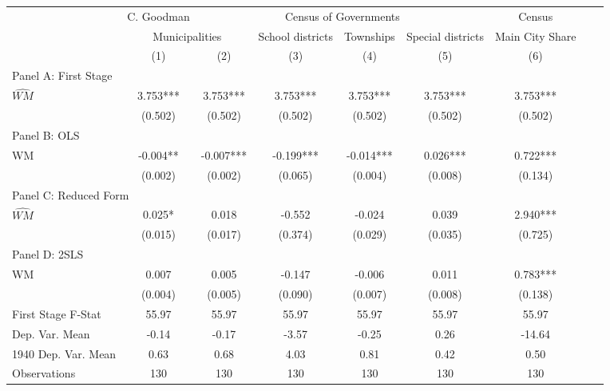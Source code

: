  \begin{tabular}{l*{8}{c}} \toprule
&\multicolumn{1}{c}{C. Goodman}&\multicolumn{4}{c}{Census of Governments}&\multicolumn{1}{c}{Census}\\\cmidrule(lr){2-2}\cmidrule(lr){3-6}\cmidrule(lr){7-7}
&\multicolumn{2}{c}{Municipalities}&\multicolumn{1}{c}{School districts}&\multicolumn{1}{c}{Townships}&\multicolumn{1}{c}{Special districts}&\multicolumn{1}{c}{Main City Share}\\\cmidrule(lr){2-3}\cmidrule(lr){4-6}\cmidrule(lr){7-7}
&\multicolumn{1}{c}{(1)}&\multicolumn{1}{c}{(2)}&\multicolumn{1}{c}{(3)}&\multicolumn{1}{c}{(4)}&\multicolumn{1}{c}{(5)}&\multicolumn{1}{c}{(6)}\\
\cmidrule(lr){1-7}
\multicolumn{6}{l}{Panel A: First Stage}\\
\cmidrule(lr){1-7}
$\widehat{WM}$  &    3.753***&    3.753***&    3.753***&    3.753***&    3.753***&    3.753***\\
                &  (0.502)   &  (0.502)   &  (0.502)   &  (0.502)   &  (0.502)   &  (0.502)   \\
\cmidrule(lr){1-7}
\multicolumn{6}{l}{Panel B: OLS}\\
\cmidrule(lr){1-7}
WM              &   -0.004** &   -0.007***&   -0.199***&   -0.014***&    0.026***&    0.722***\\
                &  (0.002)   &  (0.002)   &  (0.065)   &  (0.004)   &  (0.008)   &  (0.134)   \\
\cmidrule(lr){1-7}
\multicolumn{6}{l}{Panel C: Reduced Form}\\
\cmidrule(lr){1-7}
$\widehat{WM}$  &    0.025*  &    0.018   &   -0.552   &   -0.024   &    0.039   &    2.940***\\
                &  (0.015)   &  (0.017)   &  (0.374)   &  (0.029)   &  (0.035)   &  (0.725)   \\
\cmidrule(lr){1-7}
\multicolumn{6}{l}{Panel D: 2SLS}\\
\cmidrule(lr){1-7}
WM              &    0.007   &    0.005   &   -0.147   &   -0.006   &    0.011   &    0.783***\\
                &  (0.004)   &  (0.005)   &  (0.090)   &  (0.007)   &  (0.008)   &  (0.138)   \\
\midrule
First Stage F-Stat&    55.97   &    55.97   &    55.97   &    55.97   &    55.97   &    55.97   \\
Dep. Var. Mean  &    -0.14   &    -0.17   &    -3.57   &    -0.25   &     0.26   &   -14.64   \\
1940 Dep. Var. Mean&     0.63   &     0.68   &     4.03   &     0.81   &     0.42   &     0.50   \\
Observations    &      130   &      130   &      130   &      130   &      130   &      130   \\
       \bottomrule \end{tabular}

